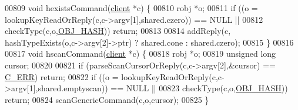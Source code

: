 \begin{DoxyCode}
00809 \textcolor{keywordtype}{void} hexistsCommand(\hyperlink{structclient}{client} *c) \{
00810     robj *o;
00811     \textcolor{keywordflow}{if} ((o = lookupKeyReadOrReply(c,c->argv[1],shared.czero)) == NULL ||
00812         checkType(c,o,\hyperlink{server_8h_a87c05ba4f7f36741864277f02a4423fb}{OBJ\_HASH})) \textcolor{keywordflow}{return};
00813 
00814     addReply(c, hashTypeExists(o,c->argv[2]->ptr) ? shared.cone : shared.czero);
00815 \}
00816 
00817 \textcolor{keywordtype}{void} hscanCommand(\hyperlink{structclient}{client} *c) \{
00818     robj *o;
00819     \textcolor{keywordtype}{unsigned} \textcolor{keywordtype}{long} cursor;
00820 
00821     \textcolor{keywordflow}{if} (parseScanCursorOrReply(c,c->argv[2],&cursor) == \hyperlink{server_8h_af98ac28d5f4d23d7ed5985188e6fb7d1}{C\_ERR}) \textcolor{keywordflow}{return};
00822     \textcolor{keywordflow}{if} ((o = lookupKeyReadOrReply(c,c->argv[1],shared.emptyscan)) == NULL ||
00823         checkType(c,o,\hyperlink{server_8h_a87c05ba4f7f36741864277f02a4423fb}{OBJ\_HASH})) \textcolor{keywordflow}{return};
00824     scanGenericCommand(c,o,cursor);
00825 \}
\end{DoxyCode}
